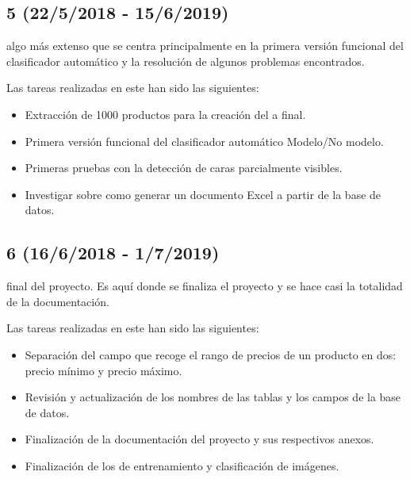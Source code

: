 \subsection{ 5 (22/5/2018 - 15/6/2019)}
 algo más extenso que se centra principalmente en la primera versión funcional del clasificador automático y la resolución de algunos problemas encontrados.


Las tareas realizadas en este  han sido las siguientes:

\begin{itemize}
    \item Extracción de 1000 productos para la creación del a final.
    \item Primera versión funcional del clasificador automático Modelo/No modelo.
    \item Primeras pruebas con la detección de caras parcialmente visibles.
    \item Investigar sobre como generar un documento Excel a partir de la base de datos.
\end{itemize}


\subsection{ 6 (16/6/2018 - 1/7/2019)}
 final del proyecto. Es aquí donde se finaliza el proyecto y se hace casi la totalidad de la documentación.


Las tareas realizadas en este  han sido las siguientes:

\begin{itemize}
    \item Separación del campo que recoge el rango de precios de un producto en dos: precio mínimo y precio máximo.
    \item Revisión y actualización de los nombres de las tablas y los campos de la base de datos.
    \item Finalización de la documentación del proyecto y sus respectivos anexos.
    \item Finalización de los  de entrenamiento y clasificación de imágenes.
\end{itemize}



